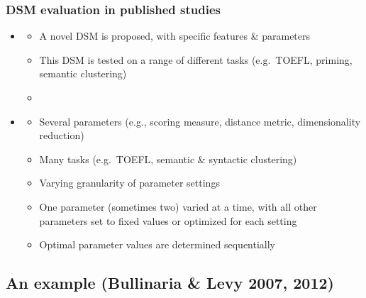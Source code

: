 \documentclass[t]{beamer} %
\begin{document}
\begin{frame}
  \frametitle{DSM evaluation in published studies}

  \begin{itemize}
  \item {} \citep{Pado:Lapata:07,Baroni:Lenci:10}
    \begin{itemize}
    \item A novel DSM is proposed, with specific features \& parameters
    \item This DSM is tested on a range of different tasks (e.g.\ TOEFL, priming, semantic clustering)
    \item[]
    \end{itemize}

  \item<2->  \citep{Bullinaria:Levy:07,Bullinaria:Levy:12,Kiela:Clark:14,Polajnar:Clark:14}
    \begin{itemize}
    \item Several parameters (e.g., scoring measure, distance metric, dimensionality reduction) 
    \item Many tasks (e.g.\ TOEFL, semantic \& syntactic clustering)
    \item Varying granularity of parameter settings
    \item One parameter (sometimes two) varied at a time, with all other parameters set to fixed values or optimized for each setting
    \item Optimal parameter values are determined sequentially
    \end{itemize}

  \end{itemize}
\end{frame}



\subsection{An example (Bullinaria \& Levy 2007, 2012)}
\end{document}
